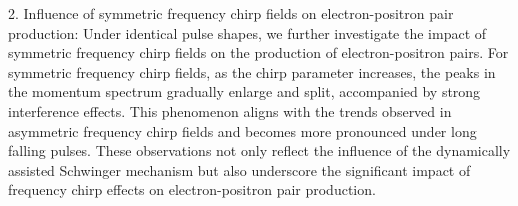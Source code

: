 \begin{abstract*}
2. Influence of symmetric frequency chirp fields on electron-positron pair production: Under identical pulse shapes, we further investigate the impact of symmetric frequency chirp fields on the production of electron-positron pairs. For symmetric frequency chirp fields, as the chirp parameter increases, the peaks in the momentum spectrum gradually enlarge and split, accompanied by strong interference effects. This phenomenon aligns with the trends observed in asymmetric frequency chirp fields and becomes more pronounced under long falling pulses. These observations not only reflect the influence of the dynamically assisted Schwinger mechanism but also underscore the significant impact of frequency chirp effects on electron-positron pair production.
\end{abstract*}
